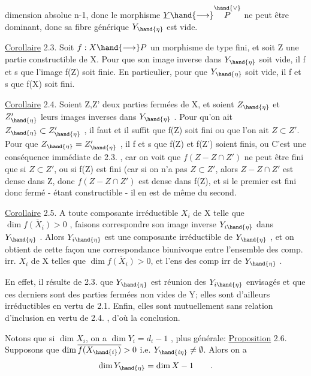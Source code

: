 
dimension absolue n-1, donc le morphisme $\underline{Y}\hand{\longrightarrow} \overset{\hand{\vee}}{P}$ ne peut être dominant,
donc sa fibre générique $Y_{\hand{\eta}}$ est vide.

\uline{Corollaire} 2.3. Soit $f:X\hand{\longrightarrow} P$ un morphisme de type fini, et soit Z une
partie constructible de X. Pour que son image inverse dans $Y_{\hand{\eta}}$ soit vide,
il f et s que l'image f(Z) soit finie. En particulier, pour que  $Y_{\hand{\eta}}$ soit
vide, il f et s que f(X) soit fini.

\uline{Corollaire} 2.4. Soient Z,Z' deux parties fermées  de X,
et soient $Z_{\hand{\eta}}$ et $Z'_{\hand{\eta}}$ leurs images inverses dans $Y_{\hand{\eta}}$ . Pour qu'on ait
$Z_{\hand{\eta}}\subset Z'_{\hand{\eta}}$ , il faut et il suffit que f(Z) soit fini ou que l'on ait $Z\subset Z'$.
Pour que $Z_{\hand{\eta}} = Z'_{\hand{\eta}}$ , il f et s que  f(Z) et f(Z') soient finis, ou 
 C'est une conséquence 
 immédiate de 2.3. , car on voit que $f(Z - Z\cap Z')$ ne peut être fini
que si $Z\subset Z'$, ou si f(Z) est fini (car si on n'a pas $Z\subset Z'$, alors $Z-Z\cap Z'$
est dense dans Z, donc $f(Z-Z\cap Z')$ est dense dans f(Z), et si le premier
est fini donc fermé - étant constructible - il en est de même du second.

\uline{Corollaire} 2.5. A toute composante irréductible $X_i$ de X telle que
$\dim \overline{f(X_i)} > 0$ , faisons correspondre  son image inverse $Y_{i\hand{\eta}}$ dans
$Y_{\hand{\eta}}$ . Alors $Y_{i\hand{\eta}}$ est une composante irréductible de $Y_{\hand{\eta}}$ , et on obtient de
cette façon une correspondance biunivoque entre l'ensemble des comp. irr.
$X_i$ de X telles que $\dim \overline{f(X_i)}> 0$, et l'ens des comp irr de $Y_{\hand{\eta}}$ .

En effet, il résulte de 2.3. que  $Y_{\hand{\eta}}$ est réunion des $Y_{i\hand{\eta}}$ envisagés
et que ces derniers sont des parties fermées non vides de Y; elles sont
d'ailleurs irréductibles en vertu de 2.1. Enfin, elles sont mutuellement
sans relation d'inclusion en vertu de 2.4. , d'où la conclusion.

Notons que si  $\dim X_i$,  on a $\dim Y_i = d_i-1$ ,  plus générale:
\uline{Proposition} 2.6. Supposons que  $\dim \overline{f(X_{\hand{i}})} > 0$ i.e. $Y_{\hand{i\eta}} \neq \emptyset$. Alors on a
\[ \dim Y_{\hand{\eta}} = \dim X - 1 \qquad . \]

